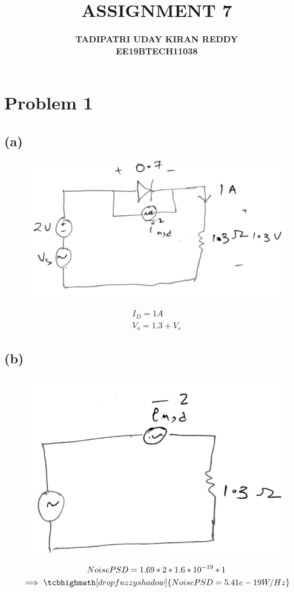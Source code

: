 \documentclass{article}
\begin{document}
\title{{\textbf{ASSIGNMENT 7}}}
\author{\textbf{TADIPATRI UDAY KIRAN REDDY}\\\textbf{EE19BTECH11038}}
\maketitle

\section*{\hfil Problem 1}
\subsection*{(a)}
\begin{figure}[H]
	\centering
	\includegraphics[scale=0.25]{./figs/1a.png}
\end{figure}
\begin{gather*}
	I_D = 1A\\
	V_o = 1.3 + V_s
\end{gather*}
\subsection*{(b)}
\begin{figure}[H]
	\centering
	\includegraphics[scale=0.3]{./figs/1b.png}
\end{figure}
\begin{gather*}
NoisePSD = 1.69*2*1.6*10^{-19}*1\\
\implies \tcbhighmath[drop fuzzy shadow]{NoisePSD = 5.41e-19 W/Hz}
\end{gather*}
\end{document}
